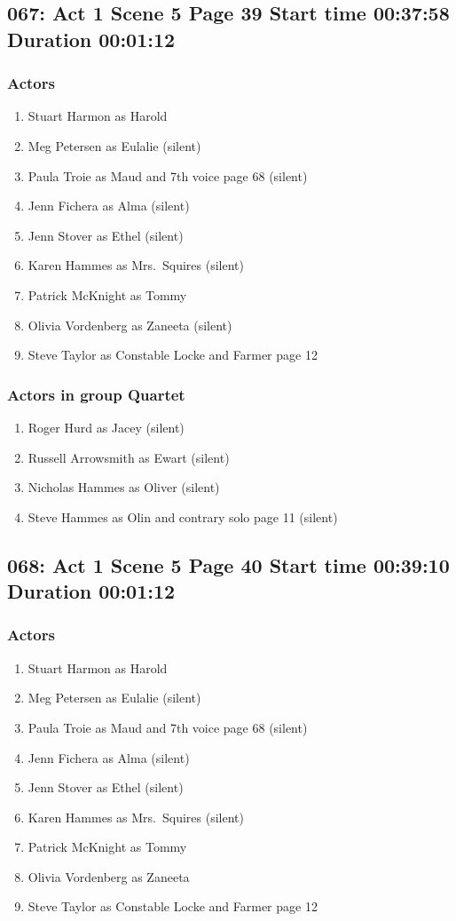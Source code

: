 \subsection{067: Act 1 Scene 5 Page 39 Start time 00:37:58 Duration 00:01:12}

\subsubsection{Actors}
\begin{enumerate}
\item Stuart Harmon as Harold
\item Meg Petersen as Eulalie (silent)
\item Paula Troie as Maud and 7th voice page 68 (silent)
\item Jenn Fichera as Alma (silent)
\item Jenn Stover as Ethel (silent)
\item Karen Hammes as Mrs.~Squires (silent)
\item Patrick McKnight as Tommy
\item Olivia Vordenberg as Zaneeta (silent)
\item Steve Taylor as Constable Locke and Farmer page 12
\end{enumerate}
\subsubsection{Actors in group Quartet}
\begin{enumerate}
\item Roger Hurd as Jacey (silent)
\item Russell Arrowsmith as Ewart (silent)
\item Nicholas Hammes as Oliver (silent)
\item Steve Hammes as Olin and contrary solo page 11 (silent)
\end{enumerate}


\subsection{068: Act 1 Scene 5 Page 40 Start time 00:39:10 Duration 00:01:12}

\subsubsection{Actors}
\begin{enumerate}
\item Stuart Harmon as Harold
\item Meg Petersen as Eulalie (silent)
\item Paula Troie as Maud and 7th voice page 68 (silent)
\item Jenn Fichera as Alma (silent)
\item Jenn Stover as Ethel (silent)
\item Karen Hammes as Mrs.~Squires (silent)
\item Patrick McKnight as Tommy
\item Olivia Vordenberg as Zaneeta
\item Steve Taylor as Constable Locke and Farmer page 12
\end{enumerate}
